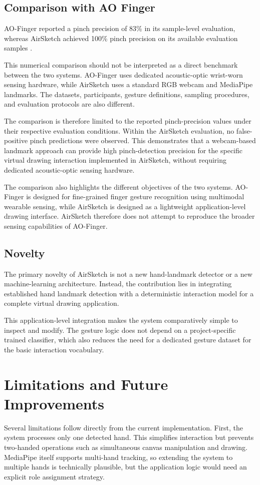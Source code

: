 \documentclass[conference]{IEEEtran}
\begin{document}
\subsection{Comparison with AO Finger}
AO-Finger reported a pinch precision of 83\% in its sample-level evaluation, whereas AirSketch achieved 100\% pinch precision on its available evaluation samples \cite{ao_finger}.

This numerical comparison should not be interpreted as a direct benchmark between the two systems. AO-Finger uses dedicated acoustic-optic wrist-worn sensing hardware, while AirSketch uses a standard RGB webcam and MediaPipe landmarks. The datasets, participants, gesture definitions, sampling procedures, and evaluation protocols are also different.

The comparison is therefore limited to the reported pinch-precision values under their respective evaluation conditions. Within the AirSketch evaluation, no false-positive pinch predictions were observed. This demonstrates that a webcam-based landmark approach can provide high pinch-detection precision for the specific virtual drawing interaction implemented in AirSketch, without requiring dedicated acoustic-optic sensing hardware.

The comparison also highlights the different objectives of the two systems. AO-Finger is designed for fine-grained finger gesture recognition using multimodal wearable sensing, while AirSketch is designed as a lightweight application-level drawing interface. AirSketch therefore does not attempt to reproduce the broader sensing capabilities of AO-Finger.

\subsection{Novelty}
The primary novelty of AirSketch is not a new hand-landmark detector or a new machine-learning architecture. Instead, the contribution lies in integrating established hand landmark detection with a deterministic interaction model for a complete virtual drawing application.

This application-level integration makes the system comparatively simple to inspect and modify. The gesture logic does not depend on a project-specific trained classifier, which also reduces the need for a dedicated gesture dataset for the basic interaction vocabulary.

\section{Limitations and Future Improvements}
Several limitations follow directly from the current implementation. First, the system processes only one detected hand. This simplifies interaction but prevents two-handed operations such as simultaneous canvas manipulation and drawing. MediaPipe itself supports multi-hand tracking, so extending the system to multiple hands is technically plausible, but the application logic would need an explicit role assignment strategy.
\end{document}
